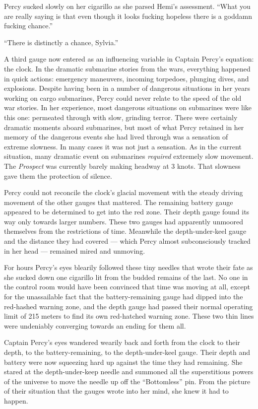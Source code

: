 \documentclass[]{article}
\begin{document}
\begin{multicols}{2}
Percy sucked slowly on her cigarillo as she parsed Hemi's assessment.
``What you are really saying is that even though it looks fucking
hopeless there is a goddamn fucking chance.''

``There is distinctly a chance, Sylvia.''

A third gauge now entered as an influencing variable in Captain Percy's
equation: the clock. In the dramatic submarine stories from the wars,
everything happened in quick actions: emergency maneuvers, incoming
torpedoes, plunging dives, and explosions. Despite having been in a
number of dangerous situations in her years working on cargo submarines,
Percy could never relate to the speed of the old war stories. In her
experience, most dangerous situations on submarines were like this one:
permeated through with slow, grinding terror. There were certainly
dramatic moments aboard submarines, but most of what Percy retained in
her memory of the dangerous events she had lived through was a sensation
of extreme slowness. In many cases it was not just a sensation. As in
the current situation, many dramatic event on submarines \emph{required}
extremely slow movement. The \emph{Prospect} was currently barely making
headway at 3 knots. That slowness gave them the protection of silence.

Percy could not reconcile the clock's glacial movement with the steady
driving movement of the other gauges that mattered. The remaining
battery gauge appeared to be determined to get into the red zone. Their
depth gauge found its way only towards larger numbers. These two gauges
had apparently unmoored themselves from the restrictions of time.
Meanwhile the depth-under-keel gauge and the distance they had covered
--- which Percy almost subconsciously tracked in her head --- remained
mired and unmoving.

For hours Percy's eyes blearily followed these tiny needles that wrote
their fate as she sucked down one cigarillo lit from the budded remains
of the last. No one in the control room would have been convinced that
time was moving at all, except for the unassailable fact that the
battery-remaining gauge had dipped into the red-hashed warning zone, and
the depth gauge had passed their normal operating limit of 215 meters to
find its own red-hatched warning zone. These two thin lines were
undeniably converging towards an ending for them all.

Captain Percy's eyes wandered wearily back and forth from the clock to
their depth, to the battery-remaining, to the depth-under-keel gauge.
Their depth and battery were now squeezing hard up against the time they
had remaining. She stared at the depth-under-keep needle and summoned
all the superstitious powers of the universe to move the needle up off
the ``Bottomless'' pin. From the picture of their situation that the
gauges wrote into her mind, she knew it had to happen.


\end{multicols}
\end{document}
